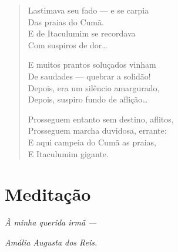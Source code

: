 \begin{verse}
Lastimava seu fado --- e se carpia\\
Das praias do Cumã.\\
E de Itaculumim se recordava\\
Com suspiros de dor\ldots{}

E muitos prantos soluçados vinham\\
De saudades --- quebrar a solidão!\\
Depois, era um silêncio amargurado,\\
Depois, suspiro fundo de aflição\ldots{}

Prosseguem entanto sem destino, aflitos,\\
Prosseguem marcha duvidosa, errante:\\
E aqui campeia do Cumã as praias,\\
E Itaculumim gigante.
\end{verse}

\chapter{Meditação}

\hfill{}\emph{À minha querida irmã ---}

\hfill{}\emph{Amália Augusta dos Reis.}

\medskip

